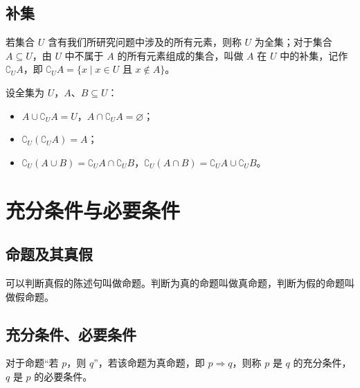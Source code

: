 \subsection{补集}
\begin{definition}[全集与补集]
若集合 $U$ 含有我们所研究问题中涉及的所有元素，则称 $U$ 为全集；对于集合 $A \subseteq U$，由 $U$ 中不属于 $A$ 的所有元素组成的集合，叫做 $A$ 在 $U$ 中的补集，记作 $\complement_U A$，即 $\complement_U A = \{x \mid x \in U \text{ 且 } x \notin A\}$。
\end{definition}
\begin{theorem}
设全集为 $U$，$A$、$B \subseteq U$：
\begin{itemize}
    \item $A \cup \complement_U A=U$，$A \cap \complement_U A=\varnothing$；
    \item $\complement_U(\complement_U A)=A$；
    \item $\complement_U(A \cup B)=\complement_U A \cap \complement_U B$，$\complement_U(A \cap B)=\complement_U A \cup \complement_U B$。
\end{itemize}
\end{theorem}

\section{充分条件与必要条件}
\subsection{命题及其真假}
\begin{definition}[命题]
可以判断真假的陈述句叫做命题。判断为真的命题叫做真命题，判断为假的命题叫做假命题。
\end{definition}
\subsection{充分条件、必要条件}
\begin{definition}[充分条件与必要条件]
对于命题“若 $p$，则 $q$”，若该命题为真命题，即 $p \Rightarrow q$，则称 $p$ 是 $q$ 的充分条件，$q$ 是 $p$ 的必要条件。
\end{definition}

